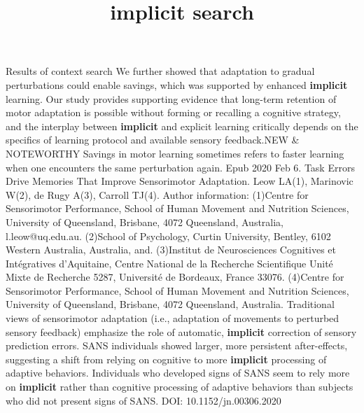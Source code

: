 \documentclass[11pt]{article}
\title { implicit search}
\begin{document}
\maketitle
Results of context search
\newline  [  1  ]   We  further showed that adaptation to gradual perturbations could enable savings,  which was supported by enhanced   \textbf {  implicit  }   learning.
\newline  [  2  ]   Our study provides supporting  evidence that long-term retention of motor adaptation is possible without  forming or recalling a cognitive strategy, and the interplay between   \textbf {  implicit  }    and explicit learning critically depends on the specifics of learning protocol  and available sensory feedback.NEW & NOTEWORTHY Savings in motor learning  sometimes refers to faster learning when one encounters the same perturbation  again.
\newline  [  3  ]  Epub 2020 Feb 6.  Task Errors Drive Memories That Improve Sensorimotor Adaptation.  Leow LA(1), Marinovic W(2), de Rugy A(3), Carroll TJ(4).  Author information: (1)Centre for Sensorimotor Performance, School of Human Movement and Nutrition  Sciences, University of Queensland, Brisbane, 4072 Queensland, Australia,  l.leow@uq.edu.au. (2)School of Psychology, Curtin University, Bentley, 6102 Western Australia,  Australia, and. (3)Institut de Neurosciences Cognitives et Intégratives d'Aquitaine, Centre  National de la Recherche Scientifique Unité Mixte de Recherche 5287, Université  de Bordeaux, France 33076. (4)Centre for Sensorimotor Performance, School of Human Movement and Nutrition  Sciences, University of Queensland, Brisbane, 4072 Queensland, Australia.  Traditional views of sensorimotor adaptation (i.e., adaptation of movements to  perturbed sensory feedback) emphasize the role of automatic,   \textbf {  implicit  }   correction  of sensory prediction errors.
\newline  [  4  ]   SANS individuals showed larger, more persistent  after-effects, suggesting a shift from relying on cognitive to more   \textbf {  implicit  }    processing of adaptive behaviors.
\newline  [  5  ]   Individuals who developed signs  of SANS seem to rely more on   \textbf {  implicit  }   rather than cognitive processing of  adaptive behaviors than subjects who did not present signs of SANS.  DOI: 10.1152/jn.00306.2020
\end{document}
